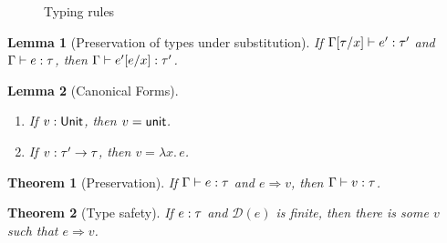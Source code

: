 \documentclass[12pt,a2paper,draft]{article}
\newcommand{\abstr}[2]{\ensuremath{\lambda{#1}.\,{#2}}}
\newcommand{\app}[2]{\ensuremath{{#1}\,{#2}}}
\newcommand{\rec}[2]{\ensuremath{{\normalfont\textsf{rec}}\,{#1}.\,{#2}}}
\newcommand{\unit}{\ensuremath{\normalfont\textsf{unit}}}
\newcommand{\Unit}{\ensuremath{\normalfont\textsf{Unit}}}
\newcommand{\tj}[2]{\mbox{\ensuremath{{#1}:{#2}}}}
\newcommand{\Tj}[3]{\mbox{\ensuremath{{#1}\vdash\tj{#2}{#3}}}}
\newcommand{\tree}[1]{\mathcal{D}(#1)}
\newtheorem{lemma}{Lemma}
\newtheorem{theorem}{Theorem}
\begin{document}
\begin{figure}[htb]
  \centering
  \caption{Typing rules}
  \label{figure:Typing_rules}
\end{figure}

\begin{lemma}[Preservation of types under substitution] \label{lemma:Preservation_of_types_under_substitution}
  If $\Tj{\Gamma[\tau/x]}{e'}{\tau'}$ and $\Tj{\Gamma}{e}{\tau}$,
  then $\Tj{\Gamma}{e'[e/x]}{\tau'}$.
\end{lemma}

\begin{lemma}[Canonical Forms] \label{lemma:Canonical_Forms} \
  \begin{enumerate}
  \item If $\tj{v}{\Unit}$, then $v = \unit$.
  \item If $\tj{v}{\tau' \to \tau}$, then $v = \abstr{x}{e}$.
  \end{enumerate}
\end{lemma}

\begin{theorem}[Preservation] \label{theorem:Preservation}
  If $\Tj{\Gamma}{e}{\tau}$ and $e \Rightarrow v$, then $\Tj{\Gamma}{v}{\tau}$.
\end{theorem}

\begin{theorem}[Type safety]
  If $\tj{e}{\tau}$ and $\tree{e}$ is finite, then there is some $v$ such that $e \Rightarrow v$.
\end{theorem}
\end{document}
